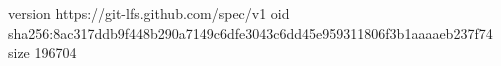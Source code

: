 version https://git-lfs.github.com/spec/v1
oid sha256:8ac317ddb9f448b290a7149c6dfe3043c6dd45e959311806f3b1aaaaeb237f74
size 196704
